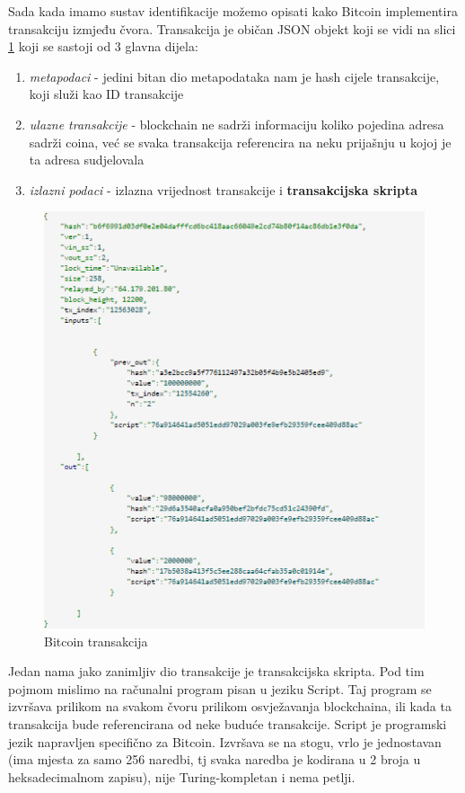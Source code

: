 \documentclass[12pt]{report}
\begin{document}
Sada kada imamo sustav identifikacije možemo opisati kako Bitcoin implementira transakciju izmjeđu čvora. Transakcija je običan JSON objekt koji se vidi na slici \ref{fig:transakcija} koji se sastoji od 3 glavna dijela:
\begin{enumerate}
    \item \textit{metapodaci} - jedini bitan dio metapodataka nam je hash cijele transakcije, koji služi kao ID transakcije
    \item\textit{ulazne transakcije} - blockchain ne sadrži informaciju koliko pojedina adresa sadrži coina, već se svaka transakcija referencira na neku prijašnju u kojoj je ta adresa sudjelovala
    \item \textit{izlazni podaci} - izlazna vrijednost transakcije i \textbf{transakcijska skripta}
\end{enumerate}

\begin{figure}[h]
\centering
\includegraphics[scale=0.9]{transakcija}
\caption{Bitcoin transakcija}
\label{fig:transakcija}
\end{figure}

Jedan nama jako zanimljiv dio transakcije je transakcijska skripta. Pod tim pojmom mislimo na računalni program pisan u jeziku Script. Taj program se izvršava prilikom na svakom čvoru prilikom osvježavanja blockchaina, ili kada ta transakcija bude referencirana od neke buduće transakcije. Script\cite{script} je programski jezik napravljen specifično za Bitcoin. Izvršava se na stogu, vrlo je jednostavan (ima mjesta za samo 256 naredbi, tj svaka naredba je kodirana u 2 broja u heksadecimalnom zapisu), nije Turing-kompletan i nema petlji.
\end{document}
